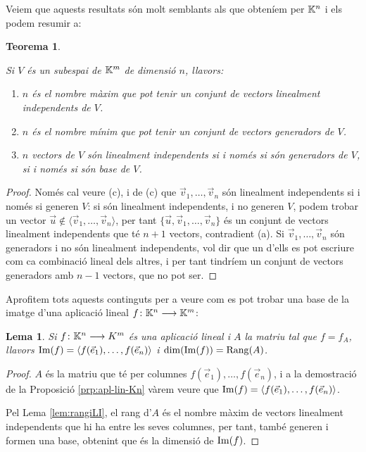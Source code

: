 \documentclass[
  11pt,
]{book}
\numberwithin{dummy}{section}
\theoremstyle{maincolornumbox}
\newtheorem{theorem}{TTTT}[chapter]
\newtheorem{theoremeT}{Teorema}[chapter]
\theoremstyle{blacknumex}
\theoremstyle{blacknumbox}
\theoremstyle{maincolornum}
\newtheorem{lemmaT}{Lema}[chapter]
\renewenvironment{theorem}{\begin{tBox}\begin{theoremeT}}{\end{theoremeT}\end{tBox}}
\newenvironment{lemma}{\begin{pBox}\begin{lemmaT}}{\end{lemmaT}\end{pBox}}
\newlength\esp
\begin{document}
Veiem que aquests resultats són molt semblants als que obteníem per
\(\mathbb{K}^n\) i els podem resumir a:

\begin{theorem}
\protect\hypertarget{thm:baseV}{}\label{thm:baseV}

Si \(V\) és un subespai de \(\mathbb{K}^m\) de
dimensió \(n\), llavors:

\begin{enumerate}
\def\labelenumi{\arabic{enumi}.}
\item
  \(n\) és el nombre màxim que pot tenir un conjunt de vectors
  linealment independents de \(V\).
\item
  \(n\) és el nombre mínim que pot tenir un conjunt de vectors
  generadors de \(V\).
\item
  \(n\) vectors de \(V\) són linealment independents si i només si són
  generadors de \(V\), si i només si són base de \(V\).
\end{enumerate}

\end{theorem}

\begin{proof}
Només cal veure (c), i de (c) que \(\vec v_1, \dots , \vec v_n\)
són linealment independents si i només si generen \(V\): si són linealment
independents, i no generen \(V\), podem trobar un vector
\(\vec u\not\in\langle \vec v_1,\dots, \vec v_n\rangle\), per tant
\(\{\vec u, \vec v_1,\dots,\vec v_n\}\) és un conjunt de vectors
linealment independents que té \(n+1\) vectors, contradient (a). Si
\(\vec v_1, \dots , \vec v_n\) són generadors i no són linealment
independents, vol dir que un d'ells es pot escriure com ca combinació
lineal dels altres, i per tant tindríem un conjunt de vectors generadors
amb \(n-1\) vectors, que no pot ser.
\end{proof}

Aprofitem tots aquests continguts per a veure com es pot trobar una base
de la imatge d'una aplicació lineal \(f\colon \mathbb{K}^n\longrightarrow \mathbb{K}^m\):

\begin{lemma}
\protect\hypertarget{lem:imfA}{}\label{lem:imfA}Si \(f\colon \mathbb{K}^n \longrightarrow K^m\) és una
aplicació lineal i \(A\) la matriu tal que \(f=f_A\), llavors
\(\operatorname{Im}(f)=\langle f(\vec e_1), \dots, f(\vec e_n) \rangle\) i
\(\dim(\operatorname{Im}(f))=\operatorname{Rang}(A)\).
\end{lemma}

\begin{proof}
\(A\) és la matriu que té per columnes
\(f(\vec e_1), \dots, f(\vec e_n)\), i a la demostració de la Proposició
\ref{prp:apl-lin-Kn} vàrem veure que
\(\operatorname{Im}(f)=\langle f(\vec e_1), \dots, f(\vec e_n) \rangle\).

Pel Lema \ref{lem:rangiLI}, el rang d'\(A\) és el nombre màxim de vectors
linealment independents que hi ha entre les seves columnes, per tant,
també generen i formen una base, obtenint que és la dimensió de
\(\operatorname{Im}(f)\).
\end{proof}
\end{document}
